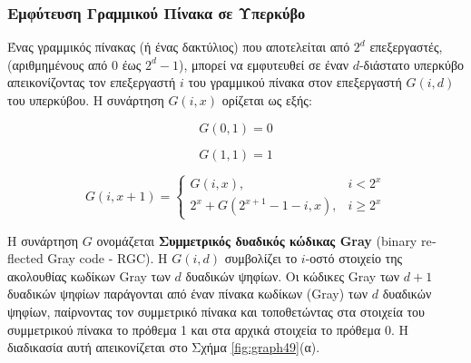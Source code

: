 \documentclass[12pt,a4paper]{article}
\begin{document}
\subsubsection{Εμφύτευση Γραμμικού Πίνακα σε Υπερκύβο}
Ένας γραμμικός πίνακας (ή ένας δακτύλιος) που αποτελείται από $2^d$ 
επεξεργαστές, (αριθμημένους από 0 έως $2^d - 1$), μπορεί να εμφυτευθεί 
σε έναν $d$-διάστατο υπερκύβο απεικονίζοντας τον επεξεργαστή $i$ του 
γραμμικού πίνακα στον επεξεργαστή $G(i,d)$ του υπερκύβου. Η συνάρτηση 
$G(i,x)$ ορίζεται ως εξής:

\[
G(0,1)=0
\]

\[
G(1,1)=1
\]

\[
G(i,x+1)=
\begin{cases}
G(i,x), & i < 2^x \\
2^x + G(2^{x+1}-1-i,x), & i \geq 2^x
\end{cases}
\]

Η συνάρτηση $G$ ονομάζεται \textbf{Συμμετρικός δυαδικός κώδικας \foreignlanguage{english}{Gray}}
(\foreignlanguage{english}{binary reflected Gray code - RGC}). Η 
$G(i,d)$ συμβολίζει το $i$-οστό στοιχείο της ακολουθίας κωδίκων 
\foreignlanguage{english}{Gray} των $d$ δυαδικών ψηφίων. Οι κώδικες 
\foreignlanguage{english}{Gray} των $d+1$ δυαδικών ψηφίων παράγονται
από έναν πίνακα κωδίκων (\foreignlanguage{english}{Gray}) των $d$ δυαδικών 
ψηφίων, παίρνοντας τον συμμετρικό πίνακα και τοποθετώντας στα στοιχεία του
συμμετρικού πίνακα το πρόθεμα 1 και στα αρχικά στοιχεία το πρόθεμα 0. Η 
διαδικασία αυτή απεικονίζεται στο Σχήμα \ref{fig:graph49}(α).
\end{document}
